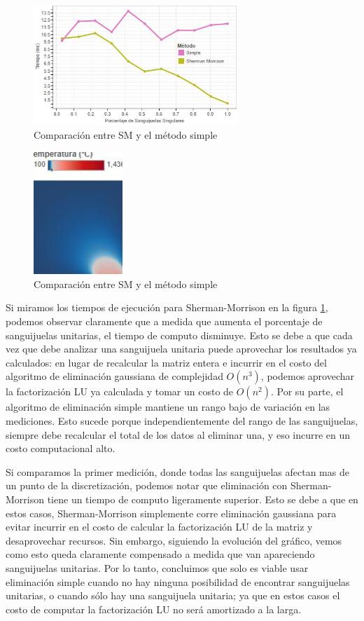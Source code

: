 \begin{figure}[H]
    \centering
    \includegraphics[width=0.685\textwidth]{experimento 3-1}
    \caption{Comparación entre SM y el método simple}
    \label{fig:exp31}
\end{figure}

\begin{figure}[H]
    \centering
    \includegraphics[width=0.30\textwidth]{Ejemplo SM}
    \caption{Comparación entre SM y el método simple}
    \label{fig:exp31-vis}
\end{figure}

Si miramos los tiempos de ejecución para Sherman-Morrison en la figura \ref{fig:exp31}, podemos observar claramente que a medida que aumenta el porcentaje de sanguijuelas unitarias, el tiempo de computo disminuye. Esto se debe a que cada vez que debe analizar una sanguijuela unitaria puede aprovechar los resultados ya calculados: en lugar de recalcular la matriz entera e incurrir en el costo del algoritmo de eliminación gaussiana de complejidad $O(n^3)$, podemos aprovechar la factorización LU ya calculada y tomar un costo de $O(n^2)$. Por su parte, el algoritmo de eliminación simple mantiene un rango bajo de variación en las mediciones. Esto sucede porque independientemente del rango de las sanguijuelas, siempre debe recalcular el total de los datos al eliminar una, y eso incurre en un costo computacional alto.

Si comparamos la primer medición, donde todas las sanguijuelas afectan mas de un punto de la discretización, podemos notar que eliminación con Sherman-Morrison tiene un tiempo de computo ligeramente superior. Esto se debe a que en estos casos, Sherman-Morrison simplemente corre eliminación gaussiana para evitar incurrir en el costo de calcular la factorización LU de la matriz y desaprovechar recursos. Sin embargo, siguiendo la evolución del gráfico, vemos como esto queda claramente compensado a medida que van apareciendo sanguijuelas unitarias. Por lo tanto, concluimos que solo es viable usar eliminación simple cuando no hay ninguna posibilidad de encontrar sanguijuelas unitarias, o cuando sólo hay una sanguijuela unitaria; ya que en estos casos el costo de computar la factorización LU no será amortizado a la larga.